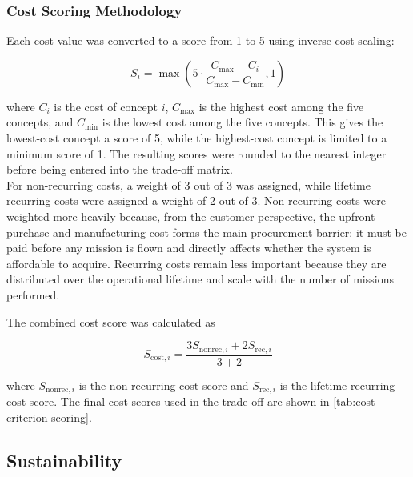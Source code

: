 \subsubsection*{Cost Scoring Methodology}

Each cost value was converted to a score from 1 to 5 using inverse cost scaling:

\begin{equation}
S_i =
\max \left(
5 \cdot
\frac{C_{\max} - C_i}{C_{\max} - C_{\min}},
1
\right)
\end{equation}

where \(C_i\) is the cost of concept \(i\), \(C_{\max}\) is the highest cost among the five concepts, and \(C_{\min}\) is the lowest cost among the five concepts. This gives the lowest-cost concept a score of 5, while the highest-cost concept is limited to a minimum score of 1. The resulting scores were rounded to the nearest integer before being entered into the trade-off matrix.
\\

For non-recurring costs, a weight of 3 out of 3 was assigned, while lifetime recurring costs were assigned a weight of 2 out of 3. Non-recurring costs were weighted more heavily because, from the customer perspective, the upfront purchase and manufacturing cost forms the main procurement barrier: it must be paid before any mission is flown and directly affects whether the system is affordable to acquire. Recurring costs remain less important because they are distributed over the operational lifetime and scale with the number of missions performed.

The combined cost score was calculated as

\begin{equation}
S_{\mathrm{cost},i}
=
\frac{
3S_{\mathrm{nonrec},i}
+
2S_{\mathrm{rec},i}
}{3+2}
\end{equation}

where \(S_{\mathrm{nonrec},i}\) is the non-recurring cost score and \(S_{\mathrm{rec},i}\) is the lifetime recurring cost score. The final cost scores used in the trade-off are shown in \autoref{tab:cost-criterion-scoring}.














\subsection{Sustainability}

